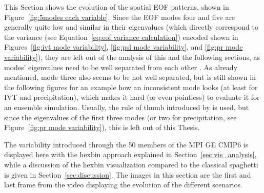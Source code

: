 This Section shows the evolution of the spatial EOF patterns, shown in Figure~\ref{fig:5modes each variable}. 
Since the EOF modes four and five are generally quite low and similar in their eigenvalues (which directly correspond to the variance (see Equation~\ref{eq:eof variance calculation}) encoded shown in Figures~\ref{fig:ivt mode variability}, \ref{fig:psl mode variability}, and \ref{fig:pr mode variability}), they are left out of the analysis of this and the following sections, as modes' eigenvalues need to be well separated from each other \cite{hannachi_empirical_2007}. 
As already mentioned, mode three also seems to be not well separated, but is still shown in the following figures for an example how an inconsistent mode looks (at least for IVT and precipitation), which makes it hard (or even pointless) to evaluate it for an ensemble simulation.  
Usually, the rule of thumb introduced by  is used, but since the eigenvalues of the first three modes (or two for precipitation, see Figure~\ref{fig:pr mode variability}), this is left out of this Thesis. 

The variability introduced through the 50 members of the MPI GE CMIP6 is displayed here with the hexbin approach explained in Section~\ref{sec:vis_analysis}, while a discussion of the hexbin visualization compared to the classical spaghetti is given in Section~\ref{sec:discussion}.
The images in this section are the first and last frame from the video displaying the evolution of the different scenarios.  

